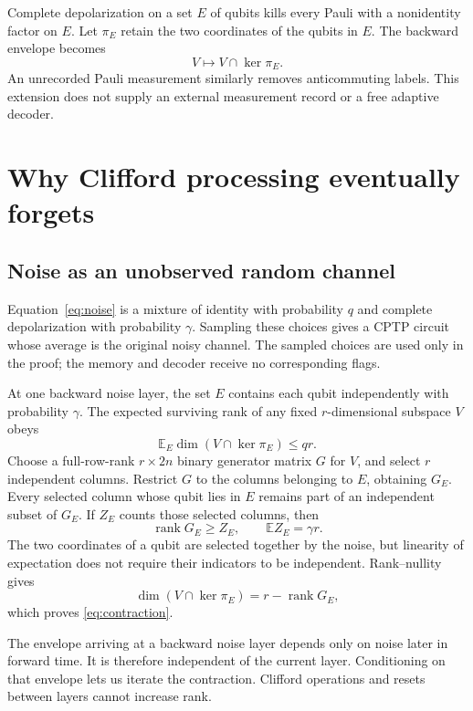 \documentclass[11pt,a4paper]{article}
\numberwithin{equation}{section}
\theoremstyle{remark}\newtheorem*{remark}{Interpretation}
\newcommand{\rank}{\operatorname{rank}}
\newcommand{\E}{\mathbb E}
\begin{document}
Complete depolarization on a set $E$ of qubits kills every Pauli with a nonidentity factor on $E$. Let $\pi_E$ retain the two coordinates of the qubits in $E$. The backward envelope becomes
\begin{equation}
V\longmapsto V\cap\ker\pi_E.
\label{eq:intersection}
\end{equation}
An unrecorded Pauli measurement similarly removes anticommuting labels. This extension does not supply an external measurement record or a free adaptive decoder.

\section{Why Clifford processing eventually forgets}
\subsection{Noise as an unobserved random channel}
Equation~\eqref{eq:noise} is a mixture of identity with probability $q$ and complete depolarization with probability $\gamma$. Sampling these choices gives a CPTP circuit whose average is the original noisy channel. The sampled choices are used only in the proof; the memory and decoder receive no corresponding flags.

At one backward noise layer, the set $E$ contains each qubit independently with probability $\gamma$. The expected surviving rank of any fixed $r$-dimensional subspace $V$ obeys
\begin{equation}
\E_E\dim(V\cap\ker\pi_E)\le qr.
\label{eq:contraction}
\end{equation}
Choose a full-row-rank $r\times2n$ binary generator matrix $G$ for $V$, and select $r$ independent columns. Restrict $G$ to the columns belonging to $E$, obtaining $G_E$. Every selected column whose qubit lies in $E$ remains part of an independent subset of $G_E$. If $Z_E$ counts those selected columns, then
\begin{equation}
\rank G_E\ge Z_E,\qquad \E Z_E=\gamma r.
\end{equation}
The two coordinates of a qubit are selected together by the noise, but linearity of expectation does not require their indicators to be independent. Rank--nullity gives
\begin{equation}
\dim(V\cap\ker\pi_E)=r-\rank G_E,
\end{equation}
which proves \eqref{eq:contraction}.

The envelope arriving at a backward noise layer depends only on noise later in forward time. It is therefore independent of the current layer. Conditioning on that envelope lets us iterate the contraction. Clifford operations and resets between layers cannot increase rank.
\end{document}
